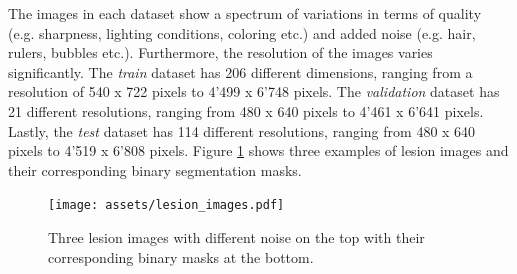 The images in each dataset show a spectrum of variations in terms of quality (e.g. sharpness, lighting conditions, coloring etc.) and added noise (e.g. hair, rulers, bubbles etc.). Furthermore, the resolution of the images varies significantly. The \emph{train} dataset has 206 different dimensions, ranging from a resolution of 540 x 722 pixels to 4'499 x 6'748 pixels. The \emph{validation} dataset has 21 different resolutions, ranging from 480 x 640 pixels to 4'461 x 6'641 pixels. Lastly, the \emph{test} dataset has 114 different resolutions, ranging from 480 x 640 pixels to 4'519 x 6'808 pixels. Figure \ref{lesion_images} shows three examples of lesion images and their corresponding binary segmentation masks.

\begin{figure}[ht]
\centering
\texttt{[image: assets/lesion\_images.pdf]}
\caption[Lesion Images]
{Three lesion images with different noise on the top with their corresponding binary masks at the bottom.}
\label{lesion_images}
\end{figure}


